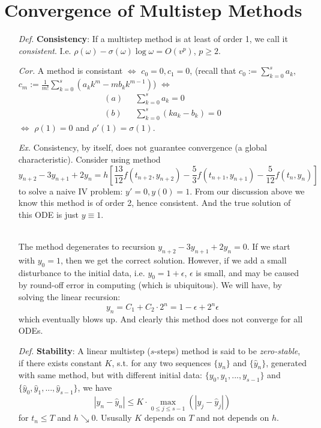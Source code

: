 \documentclass[a4paper, 11pt]{article}
\begin{document}
\section{Convergence of Multistep Methods}
\begin{itemize}
	\item[\textit{Def.}] \textbf{Consistency}: If a multistep method is at least of order 1, we call it \emph{consistent}. I.e. $\rho(\omega) - \sigma(\omega) \log \omega = O(v^p)$, $p\geq 2$.

	\item[\textit{Cor.}] A method is consistant $\iff$ $c_0=0, c_1=0$, (recall that $c_0 := \sum_{k=0}^s a_k$, $c_m := \frac{1}{m!}\sum_{k=0}^s (a_k k^m - mb_k k^{m-1})$) $\iff$
	\begin{equation}
		\begin{split}
			(a)~~~&\sum_{k=0}^s a_k = 0\\
			(b)~~~&\sum_{k=0}^s (ka_k - b_k) = 0
		\end{split}
	\end{equation}
	$\iff$ $\rho(1)=0$ and $\rho'(1)=\sigma(1)$. \\

	\item[\textit{Ex.}] Consistency, by itself, does not guarantee convergence (a global characteristic). Consider using method
	$$
	y_{n+2} - 3y_{n+1} + 2y_n = h \left[\frac{13}{12}f(t_{n+2}, y_{n+2})-\frac{5}{3}f(t_{n+1}, y_{n+1})-\frac{5}{12}f(t_n, y_n)\right]
	$$
	to solve a naive IV problem: $y'=0, y(0)=1$. From our discussion above we know this method is of order 2, hence consistent. And the true solution of this ODE is just $y\equiv1$. 

	~\\
	The method degenerates to recursion $y_{n+2} - 3y_{n+1} + 2y_n=0$. If we start with $y_0=1$, then we get the correct solution. However, if we add a small disturbance to the initial data, i.e. $y_0=1+\epsilon$, $\epsilon$ is small, and may be caused by round-off error in computing (which is ubiquitous). We will have, by solving the linear recursion:
	$$
	y_n = C_1 + C_2 \cdot 2^n = 1-\epsilon + 2^n \epsilon
	$$
	which eventually blows up. And clearly this method does not converge for all ODEs.

	\item[\textit{Def.}] \textbf{Stability}: A linear multistep ($s$-steps) method is said to be \emph{zero-stable}, if there exists constant $K$, s.t. for any two sequences $\{y_n\}$ and $\{\hat{y}_n\}$, generated with same method, but with different initial data: $\{y_0, y_1, ..., y_{s-1}\}$ and $\{\hat{y}_0, \hat{y}_1, ..., \hat{y}_{s-1}\}$, we have
	$$
	|y_n - \hat{y}_n| \leq K\cdot \max\limits_{0\leq j \leq s-1} \left(|y_j - \hat{y}_j|\right)
	$$
	for $t_n \leq T$ and $h\searrow 0$. Ususally $K$ depends on $T$ and not depends on $h$.


\end{itemize}
\end{document}
